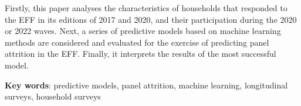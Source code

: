 Firstly, this paper analyses the characteristics of households that responded to the EFF in its editions of 2017 and 2020, and their participation during the 2020 or 2022 waves. Next, a series of predictive models based on machine learning methods are considered and evaluated for the exercise of predicting panel attrition in the EFF. Finally, it interprets the results of the most successful model.

\vspace{1.5cm}

\textbf{Key words}: predictive models, panel attrition, machine learning, longitudinal surveys, household surveys